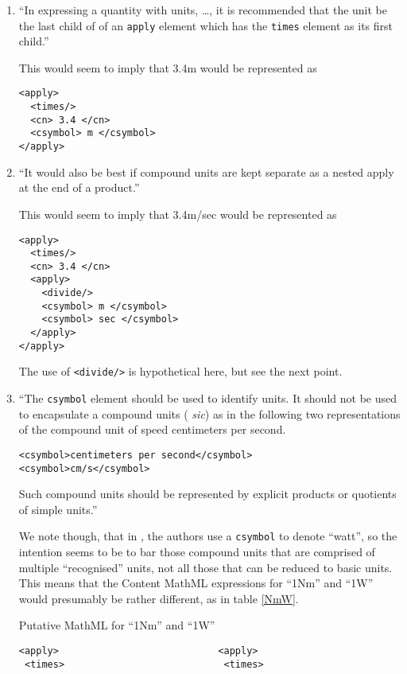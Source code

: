 \documentclass[11pt]{openmathTN}
\begin{document}
\begin{enumerate}
\item{}\label{timesunit}``In expressing a quantity with units, \dots, it is
recommended that the unit be the last child of of an \verb+apply+ element
which has the \verb+times+ element as its first child.'' \cite[section
3]{WorldWideWebConsortium2003}
\par
This would seem to imply that 3.4m would be represented as
\begin{verbatim}
<apply>
  <times/>
  <cn> 3.4 </cn>
  <csymbol> m </csymbol>
</apply>
\end{verbatim}
\item{}\label{times}``It would also be best if compound units are kept
separate as a nested apply at the end of a product.''  \cite[section
3]{WorldWideWebConsortium2003}
\par
This would seem to imply that 3.4m/sec would be represented as
\begin{verbatim}
<apply>
  <times/>
  <cn> 3.4 </cn>
  <apply>
    <divide/>
    <csymbol> m </csymbol>
    <csymbol> sec </csymbol>
  </apply>
</apply>
\end{verbatim}
The use of \verb+<divide/>+ is hypothetical here, but see the next point.
\item\label{compoundMML}``The \verb+csymbol+ element should be used to
identify units. It should not be used to encapsulate a compound units ({\it
sic}) as in the following two representations of the compound unit of speed
centimeters per second.
\begin{verbatim}
<csymbol>centimeters per second</csymbol> 
<csymbol>cm/s</csymbol> 
\end{verbatim}
Such compound units should be represented by explicit products or quotients
of simple units.'' \cite[section 5]{WorldWideWebConsortium2003} 
\par We note though, that in \cite[section
6.2]{WorldWideWebConsortium2003}, the authors use a \verb+csymbol+ to
denote ``watt'', so the intention seems to be to bar those compound units
that are comprised of multiple ``recognised'' units, not all those that can
be reduced to basic units. This means that the Content MathML expressions
for ``1Nm'' and ``1W'' would presumably be rather different, as in table
\ref{NmW}.
\begin{table}[ht]
\caption{Putative MathML for ``1Nm'' and ``1W''}\label{NmW}
\begin{verbatim}
<apply>                            <apply>
 <times>                            <times>

\end{verbatim}
\end{table}
\end{enumerate}
\end{document}
